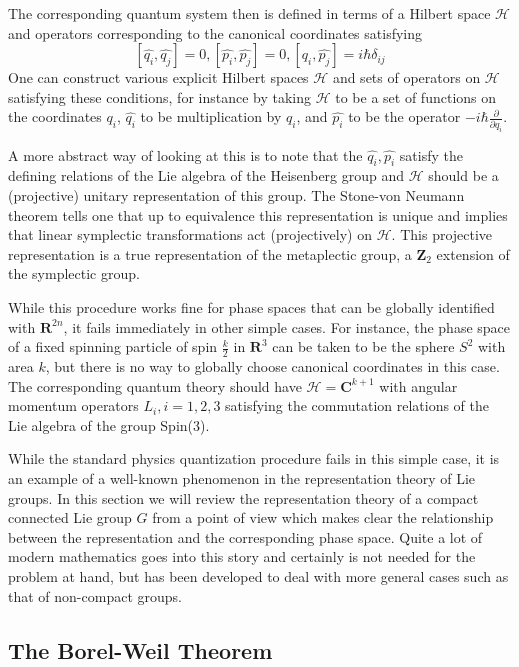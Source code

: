 \documentclass[a4paper,a4paper]{article}
\theoremstyle{conjecture}
\begin{document}
The corresponding quantum system then is defined in terms of
a Hilbert space $\mathcal H$ and operators corresponding to the
canonical coordinates satisfying
$$[\hat{q_i}, \hat{q_j}]=0, [\hat{p_i},\hat{p_j}]=0, [\hat{q_i},\hat{p_j}]=i\hbar\delta_{ij}$$
One can construct various explicit Hilbert spaces $\mathcal H$ and sets of operators
on $\mathcal H$ satisfying these conditions, for instance by taking
$\mathcal H$ to be a set of functions on the coordinates $q_i$, $\hat{q_i}$ to be multiplication
by $q_i$, and $\hat{p_i}$ to be the operator $-i\hbar\frac{\partial}{\partial q_i}$.

A more abstract way of looking at this is to note that the
$\hat{q_i},\hat{p_i}$ satisfy the defining relations of the Lie
algebra of the Heisenberg group and $\mathcal H$ should be a
(projective) unitary representation of this group. The Stone-von Neumann
theorem tells one that up to equivalence this representation is
unique and implies that linear symplectic transformations act
(projectively) on $\mathcal H$. This projective representation is
a true representation of the metaplectic group, a $\mathbf Z_2$
extension of the symplectic group.

While this procedure works fine for phase spaces that can be globally identified with $\mathbf
R^{2n}$, it fails immediately in other simple cases.  For instance, the phase space of a fixed
spinning particle of spin $\frac{k}{2}$ in $\mathbf R^3$ can be taken to be the sphere $S^2$
with area $k$, but there is no way to globally choose canonical
coordinates in this case.  The corresponding quantum theory should have ${\mathcal H} = {\mathbf
C}^{k+1}$ with angular momentum operators $L_i, i=1,2,3$ satisfying the commutation relations of
the Lie algebra of the group Spin(3).

While the standard physics quantization procedure fails in this
simple case, it is an example of a well-known phenomenon in the
representation theory of Lie groups.  In this section we will
review the representation theory of a compact connected Lie group
$G$ from a point of view which makes clear the relationship
between the representation and the corresponding phase space.
Quite a lot of modern mathematics goes into this story and
certainly is not needed for the problem at hand, but has been
developed to deal with more general cases such as that of
non-compact groups.

\subsection{The Borel-Weil Theorem}
\end{document}
